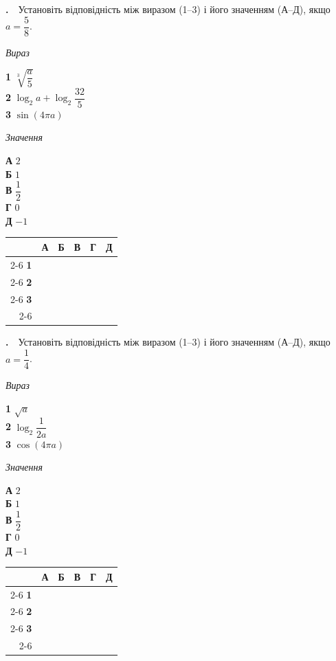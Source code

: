 \documentclass[12pt]{article}
\newcommand{\matchingGrid}{%
    \begingroup
    \renewcommand{\arraystretch}{1.15}
    \setlength{\tabcolsep}{4pt}
    \footnotesize
    \begin{tabular}{r|c|c|c|c|c|}
         \multicolumn{1}{c}{} & \multicolumn{1}{c}{\textbf{А}} & \multicolumn{1}{c}{\textbf{Б}} & \multicolumn{1}{c}{\textbf{В}} & \multicolumn{1}{c}{\textbf{Г}} & \multicolumn{1}{c}{\textbf{Д}} \\ \cline{2-6}
         \textbf{1} & \phantom{X} & \phantom{X} & \phantom{X} & \phantom{X} & \phantom{X} \\ \cline{2-6}
         \textbf{2} & & & & & \\ \cline{2-6}
         \textbf{3} & & & & & \\ \cline{2-6}
    \end{tabular}
    \endgroup
}
\newcounter{zad}
\newcommand{\zadtask}[1]{\stepcounter{zad}\noindent\textbf{\thezad.}\ \ #1\par\vspace{0.2cm}}
\begin{document}
\zadtask{Установіть відповідність між виразом (1--3) і його значенням (А--Д), якщо $a = \dfrac{5}{8}$.

\vspace{0.2cm}
\noindent
\begin{minipage}[t]{0.45\textwidth}
\textit{Вираз}\par\vspace{0.15cm}
\textbf{1} \quad $\sqrt[3]{\dfrac{a}{5}}$\\[0.35cm]
\textbf{2} \quad $\log_2 a + \log_2 \dfrac{32}{5}$\\[0.35cm]
\textbf{3} \quad $\sin(4\pi a)$
\end{minipage}
\hfill
\begin{minipage}[t]{0.3\textwidth}
\textit{Значення}\par\vspace{0.15cm}
\textbf{А} \quad $2$\\[0.15cm]
\textbf{Б} \quad $1$\\[0.15cm]
\textbf{В} \quad $\dfrac{1}{2}$\\[0.2cm]
\textbf{Г} \quad $0$\\[0.15cm]
\textbf{Д} \quad $-1$
\end{minipage}
\hfill
\begin{minipage}[t]{0.2\textwidth}
\vspace{0.4cm}
\begin{flushright}\matchingGrid\end{flushright}
\end{minipage}
}
\zadtask{Установіть відповідність між виразом (1--3) і його значенням (А--Д), якщо $a = \dfrac{1}{4}$.

\vspace{0.2cm}
\noindent
\begin{minipage}[t]{0.45\textwidth}
\textit{Вираз}\par\vspace{0.15cm}
\textbf{1} \quad $\sqrt{a}$\\[0.35cm]
\textbf{2} \quad $\log_2 \dfrac{1}{2a}$\\[0.35cm]
\textbf{3} \quad $\cos(4\pi a)$
\end{minipage}
\hfill
\begin{minipage}[t]{0.3\textwidth}
\textit{Значення}\par\vspace{0.15cm}
\textbf{А} \quad $2$\\[0.15cm]
\textbf{Б} \quad $1$\\[0.15cm]
\textbf{В} \quad $\dfrac{1}{2}$\\[0.2cm]
\textbf{Г} \quad $0$\\[0.15cm]
\textbf{Д} \quad $-1$
\end{minipage}
\hfill
\begin{minipage}[t]{0.2\textwidth}
\vspace{0.4cm}
\begin{flushright}\matchingGrid\end{flushright}
\end{minipage}
}
\end{document}
